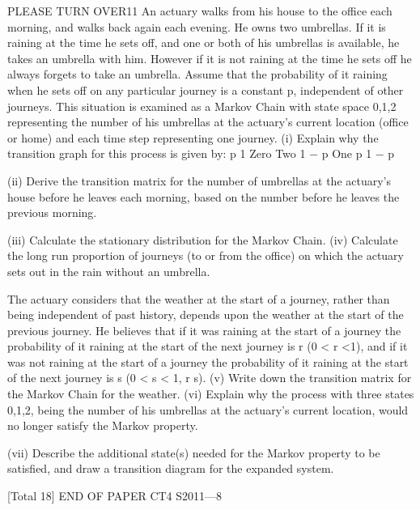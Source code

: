 \documentclass[a4paper,12pt]{article}
\begin{document}
\begin{enumerate}

PLEASE TURN OVER11
An actuary walks from his house to the office each morning, and walks back again
each evening. He owns two umbrellas. If it is raining at the time he sets off, and one
or both of his umbrellas is available, he takes an umbrella with him. However if it is
not raining at the time he sets off he always forgets to take an umbrella.
Assume that the probability of it raining when he sets off on any particular journey is
a constant p, independent of other journeys.
This situation is examined as a Markov Chain with state space {0,1,2} representing
the number of his umbrellas at the actuary’s current location (office or home) and
each time step representing one journey.
(i)
Explain why the transition graph for this process is given by:
p
1
Zero
Two
1 − p
One
p
1 − p

(ii) Derive the transition matrix for the number of umbrellas at the actuary’s house
before he leaves each morning, based on the number before he leaves the
previous morning.

(iii) Calculate the stationary distribution for the Markov Chain.
(iv) Calculate the long run proportion of journeys (to or from the office) on which the actuary sets out in the rain without an umbrella.


The actuary considers that the weather at the start of a journey, rather than being independent of past history, depends upon the weather at the start of the previous journey. He believes that if it was raining at the start of a journey the probability of it
raining at the start of the next journey is r (0 < r <1), and if it was not raining at the
start of a journey the probability of it raining at the start of the next journey is
s (0 < s < 1, r \neq s).
(v) Write down the transition matrix for the Markov Chain for the weather.
(vi) Explain why the process with three states {0,1,2}, being the number of his umbrellas at the actuary’s current location, would no longer satisfy the
Markov property.

(vii) Describe the additional state(s) needed for the Markov property to be satisfied, and draw a transition diagram for the expanded system.

[Total 18]
END OF PAPER
CT4 S2011—8




\end{enumerate}
\end{document}
